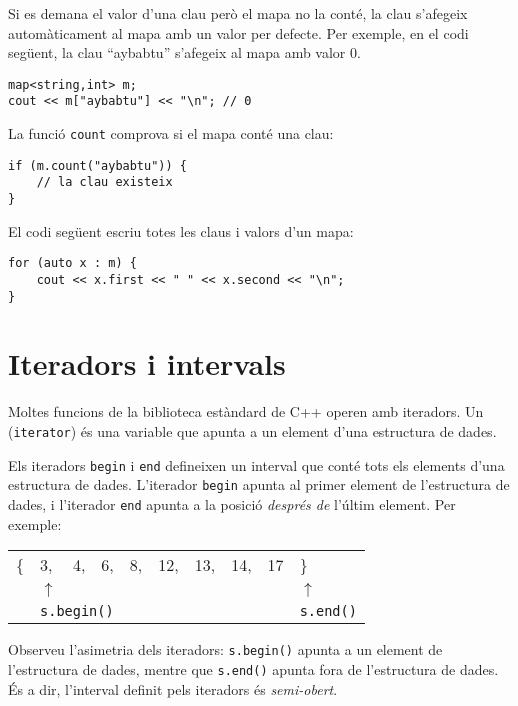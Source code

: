 Si es demana el valor d'una clau
però el mapa no la conté,
la clau s'afegeix automàticament al mapa amb
un valor per defecte.
Per exemple, en el codi següent,
la clau ``aybabtu'' s'afegeix al mapa
amb valor 0.

\begin{lstlisting}
map<string,int> m;
cout << m["aybabtu"] << "\n"; // 0
\end{lstlisting}
La funció \texttt{count} comprova
si el mapa conté una clau:
\begin{lstlisting}
if (m.count("aybabtu")) {
    // la clau existeix
}
\end{lstlisting}
El codi següent escriu totes les claus i valors
d'un mapa:
\begin{lstlisting}
for (auto x : m) {
    cout << x.first << " " << x.second << "\n";
}
\end{lstlisting}

\section{Iteradors i intervals}


Moltes funcions de la biblioteca estàndard de C++
operen amb iteradors.
Un  (\texttt{iterator}) és una variable que
apunta a un element d'una estructura de dades.

Els iteradors \texttt{begin}
i \texttt{end} defineixen un interval que conté
tots els elements d'una estructura de dades.
L'iterador \texttt{begin} apunta
al primer element de l'estructura de dades,
i l'iterador \texttt{end} apunta
a la posició \emph{després de} l'últim element.
Per exemple:

\begin{center}
\begin{tabular}{llllllllll}
\{ & 3, & 4, & 6, & 8, & 12, & 13, & 14, & 17 & \} \\
& $\uparrow$ & & & & & & & & $\uparrow$ \\
& \multicolumn{3}{l}{\texttt{s.begin()}} & & & & & & \texttt{s.end()} \\
\end{tabular}
\end{center}

Observeu l'asimetria dels iteradors:
\texttt{s.begin()} apunta a un element de l'estructura de dades,
mentre que \texttt{s.end()} apunta fora de l'estructura de dades.
És a dir, l'interval definit pels iteradors és \emph{semi-obert}.

